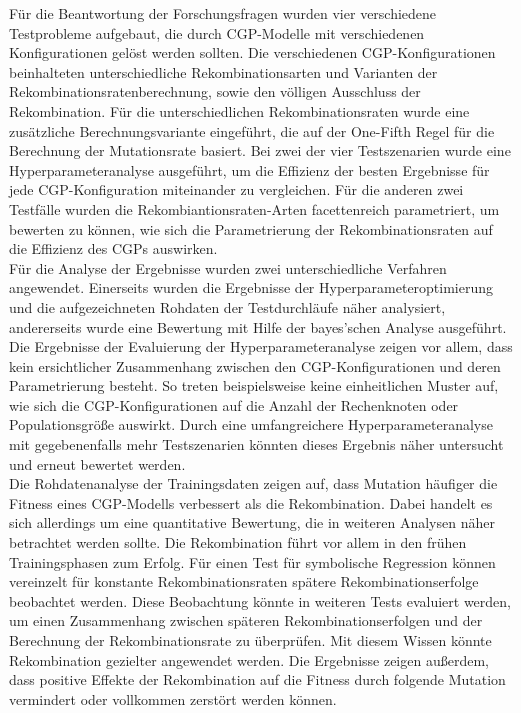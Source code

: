 Für die Beantwortung der Forschungsfragen wurden vier verschiedene Testprobleme aufgebaut, die durch CGP-Modelle mit verschiedenen Konfigurationen gelöst werden sollten.
Die verschiedenen CGP-Konfigurationen beinhalteten unterschiedliche Rekombinationsarten und Varianten der Rekombinationsratenberechnung, sowie den völligen Ausschluss der Rekombination.
Für die unterschiedlichen Rekombinationsraten wurde eine zusätzliche Berechnungsvariante eingeführt, die auf der One-Fifth Regel für die Berechnung der Mutationsrate basiert.
Bei zwei der vier Testszenarien wurde eine Hyperparameteranalyse ausgeführt, um die Effizienz der besten Ergebnisse für jede CGP-Konfiguration miteinander zu vergleichen.
Für die anderen zwei Testfälle wurden die Rekombiantionsraten-Arten facettenreich parametriert, um bewerten zu können, wie sich die Parametrierung der Rekombinationsraten auf die Effizienz des CGPs auswirken.\\
Für die Analyse der Ergebnisse wurden zwei unterschiedliche Verfahren angewendet.
Einerseits wurden die Ergebnisse der Hyperparameteroptimierung und die aufgezeichneten Rohdaten der Testdurchläufe näher analysiert, andererseits wurde eine Bewertung mit Hilfe der bayes'schen Analyse ausgeführt.\\
Die Ergebnisse der Evaluierung der Hyperparameteranalyse zeigen vor allem, dass kein ersichtlicher Zusammenhang zwischen den CGP-Konfigurationen und deren Parametrierung besteht.
So treten beispielsweise keine einheitlichen Muster auf, wie sich die CGP-Konfigurationen auf die Anzahl der Rechenknoten oder Populationsgröße auswirkt.
Durch eine umfangreichere Hyperparameteranalyse mit gegebenenfalls mehr Testszenarien könnten dieses Ergebnis näher untersucht und erneut bewertet werden.\\
Die Rohdatenanalyse der Trainingsdaten zeigen auf, dass Mutation häufiger die Fitness eines CGP-Modells verbessert als die Rekombination.
Dabei handelt es sich allerdings um eine quantitative Bewertung, die in weiteren Analysen näher betrachtet werden sollte.
Die Rekombination führt vor allem in den frühen Trainingsphasen zum Erfolg.
Für einen Test für symbolische Regression können vereinzelt für konstante Rekombinationsraten spätere Rekombinationserfolge beobachtet werden.
Diese Beobachtung könnte in weiteren Tests evaluiert werden, um einen Zusammenhang zwischen späteren Rekombinationserfolgen und der Berechnung der Rekombinationsrate zu überprüfen.
Mit diesem Wissen könnte Rekombination gezielter angewendet werden.
Die Ergebnisse zeigen außerdem, dass positive Effekte der Rekombination auf die Fitness durch folgende Mutation vermindert oder vollkommen zerstört werden können.
